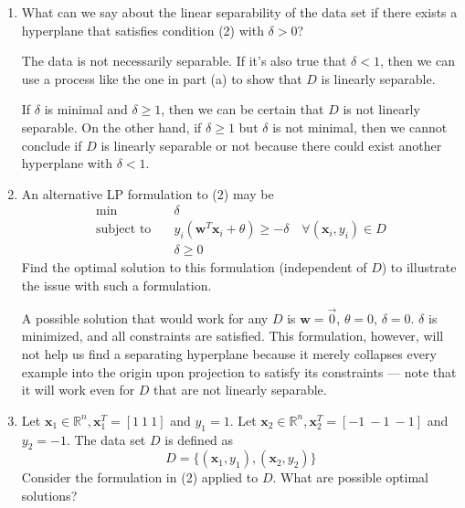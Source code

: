 \documentclass[11pt]{article}
\newenvironment{solution}{\color{blue}{\bf Solution:}}{}
\begin{document}
\begin{enumerate}
\begin{solution}
\begin{enumerate}
  \end{enumerate}
  \end{solution}

  \pagebreak
  \item What can we say about the linear separability of the data set if there
    exists a hyperplane that satisfies condition (2) with $\delta > 0$?

    \begin{solution}
    The data is not necessarily separable. If it's also true that
    $\delta < 1$, then we can use a process like the one in part (a) to show
    that $D$ is linearly separable.

    If $\delta$ is minimal and $\delta \geq 1$, then we can be certain that $D$
    is not linearly separable. On the other hand, if $\delta \geq 1$ but
    $\delta$ is not minimal, then we cannot conclude if $D$ is linearly
    separable or not because there could exist another hyperplane with
    $\delta < 1$.
    \end{solution}
    
  \pagebreak
  \item An alternative LP formulation to (2) may be
    \[
      \begin{split}
        \min             \quad& \delta\\
        \text{subject to}\quad& y_i(\mathbf{w}^T \mathbf{x}_i + \theta) \geq -\delta \quad \forall(\mathbf{x}_i, y_i) \in D\\
                         \quad& \delta \geq 0
      \end{split}
    \]
    Find the optimal solution to this formulation (independent of $D$) to
    illustrate the issue with such a formulation.

    \begin{solution}
    A possible solution that would work for any $D$ is $\mathbf{w} = \vec 0$,
    $\theta = 0$, $\delta = 0$. $\delta$ is minimized, and all constraints are
    satisfied. This formulation, however, will not help us find a separating
    hyperplane because it merely collapses every example into the origin upon
    projection to satisfy its constraints --- note that it will work even for
    $D$ that are not linearly separable.
    \end{solution}

  \pagebreak
  \item Let \(\mathbf{x}_1 \in \mathbb{R}^n, \mathbf{x}_1^T = [1~1~1]\)
    and $y_1 = 1$. Let \(\mathbf{x}_2 \in \mathbb{R}^n, \mathbf{x}_2^T =
    [-1~-1~-1]\) and $y_2 = -1$. The data set $D$ is defined as
    \[
      D = \{(\mathbf{x}_1, y_1), (\mathbf{x}_2, y_2)\}
    \]
    Consider the formulation in (2) applied to $D$. What are possible optimal
    solutions?


\end{enumerate}
\end{document}
